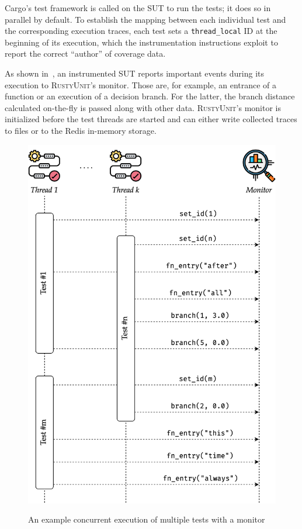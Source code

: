 \documentclass[paper=a4,%
  twoside,%
  BCOR4mm,%
  abstract=true,%
  toc=bibliography,%
  chapterprefix=true,%
  toc=bibliographynumbered,%
  open=right,%
  english,%
  pagesize=pdftex]{scrreprt}
\newcommand{\tech}{\textsc{RustyUnit}\xspace}
\newcommand{\sut}{\ac{SUT}\xspace}
\begin{document}
Cargo's test framework is called on the \sut to run the tests; it does so in parallel by default. To establish the mapping between each individual test and the corresponding execution traces, each test sets a \texttt{thread\string_local} ID at the beginning of its execution, which the instrumentation instructions exploit to report the correct ``author'' of coverage data.

As shown in~, an instrumented \sut reports important events during its execution to \tech's monitor. Those are, for example, an entrance of a function or an execution of a decision branch. For the latter, the branch distance calculated on-the-fly is passed along with other data. \tech's monitor is initialized before the test threads are started and can either write collected traces to files or to the Redis in-memory storage.

\begin{figure}[h]
\caption{An example concurrent execution of multiple tests with a monitor}
\centering
\includegraphics[width=\textwidth]{sequence-diagram/test-execution}
\label{fig:test-execution}
\end{figure}
\end{document}
